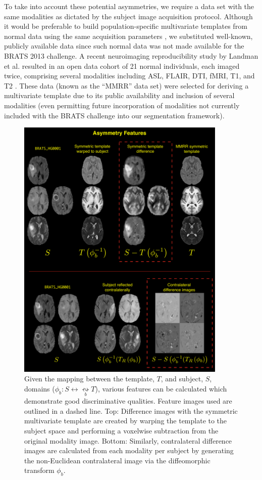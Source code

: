 \documentclass[preprint,authoryear,review,12pt]{elsarticle}
\begin{document}
To take into account these potential asymmetries, we 
require a data set with the same modalities as dictated
by the subject image acquisition protocol.  Although it
would be preferable to build population-specific multivariate
templates from normal data using the same acquisition 
parameters \citep{avants2010}, we substituted well-known,
publicly available data since such normal data was not made available
for the BRATS 2013 challenge. 
A recent neuroimaging reproducibility study
by Landman et al. resulted in an open data cohort of 21
normal individuals, each imaged twice, comprising several
modalities including ASL, FLAIR, DTI, fMRI, T1, and T2 
\citep{landman2011}.  These data (known as the
``MMRR'' data set) were selected for deriving
a multivariate template due to its public availability and
inclusion of several modalities (even permitting future 
incorporation of modalities 
not currently included with the BRATS challenge into our 
segmentation framework).  


\begin{figure}[!h]
  \centering
    \includegraphics[width=100mm]{Figures/asymmetryFeatureImages.pdf}
  \caption{ Given the mapping between the template, $T$, and subject, $S$, domains ($\phi_b: S  \leftrightarrow \underset{b}{\leftrightsquigarrow} T$), various features can be calculated which demonstrate good discriminative qualities.  Feature images used are outlined in a dashed line.
Top:  Difference images with the symmetric multivariate template are created by warping the template to the subject space and performing a voxelwise subtraction from the original modality image.
Bottom:  Similarly, contralateral difference images are calculated from each modality per subject by generating the non-Euclidean contralateral image via the diffeomorphic transform $\phi_b$.  
          }
  \label{fig:asymmetryFeatures}
\end{figure}
\end{document}
